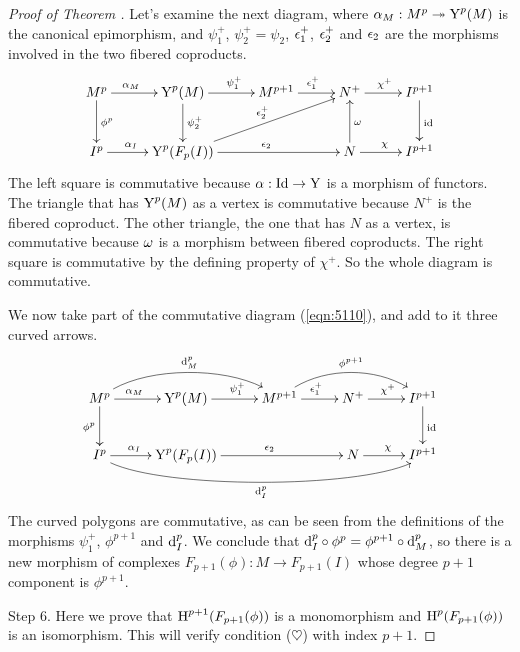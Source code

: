 \begin{proof}[Proof of Theorem \tup{\ref{thm:2880}}]
Let's examine the next diagram, where
$\alpha_M : M^p \twoheadrightarrow \operatorname{Y}^{p}(M)$ is the canonical epimorphism, and 
$\psi_1^+$, $\psi_2^+ = \psi_2$, $\epsilon_1^+$, $\epsilon_2^+$ and $\epsilon_2$ are the 
morphisms involved in  the two fibered coproducts. 
\begin{equation} \label{eqn:5110}
\UseTips \xymatrix @C=6ex @R=6ex {
M^p
\ar[r]^(0.4){\al_M}
\ar[d]^{\phi^p}
&
\opn{Y}^{p}(M)
\ar[r]^(0.55){\psi_1^+}
\ar[d]^{\psi_2^+}
&
M^{p + 1}
\ar[r]^{\ep_1^+}
&
N^+
\ar[r]^{\chi^+}
&
I^{p + 1}
\ar[d]^{\opn{id}}
\\
I^p
\ar[r]^(0.4){\al_I}
&
\opn{Y}^{p}(F_p(I))
\ar[rr]^{\ep_2}
\ar[urr]^{\ep_2^+}
&
&
N
\ar[r]^{\chi}
\ar[u]_{\om}
&
I^{p + 1}
} 
\end{equation}
The left square is commutative because $\alpha : \operatorname{Id} \to \operatorname{Y}$ is a 
morphism of functors. The triangle that has $\operatorname{Y}^{p}(M)$ as a vertex is 
commutative because $N^+$ is the fibered coproduct. The other triangle, the 
one that has $N$ as a vertex, is commutative because $\omega$ is a morphism 
between fibered coproducts. The right square is commutative by the defining 
property of $\chi^+$. So the whole diagram is commutative. 

We now take part of the commutative diagram (\ref{eqn:5110}), and add to it 
three curved arrows. 
\begin{equation} \label{eqn:5111}
\UseTips \xymatrix @C=6ex @R=5.5ex {
M^p
\ar[r]^(0.4){\al_M}
\ar[d]_{\phi^p}
\ar@(ur,ul)[rr]^{\d_{M}^{p}}
&
\opn{Y}^{p}(M)
\ar[r]^(0.55){\psi_1^+}
&
M^{p + 1}
\ar[r]^{\ep_1^+}
\ar@(ur,ul)[rr]^{\phi^{p + 1}}
&
N^+
\ar[r]^{\chi^+}
&
I^{p + 1}
\ar[d]^{\opn{id}}
\\
I^p
\ar[r]^(0.4){\al_I}
\ar@(dr,dl)[rrrr]_{\d_{I}^{p}}
&
\opn{Y}^{p}(F_p(I))
\ar[rr]^{\ep_2}
&
&
N
\ar[r]^{\chi}
&
I^{p + 1}
} 
\end{equation}
The curved polygons are commutative, as can be seen from the definitions of the 
morphisms $\psi_1^+$, $\phi^{p + 1}$ and $\mathrm{d}_{I}^{p}$. We conclude that 
$\mathrm{d}_I^{p} \circ \phi^p = \phi^{p + 1} \circ \mathrm{d}_M^{p}$,
so there is a new morphism of complexes 
$F_{p + 1}(\phi) : M \to F_{p + 1}(I)$
whose degree $p + 1$ component is $\phi^{p + 1}$. 

\medskip \noindent
Step 6. Here we prove that $\operatorname{H}^{p + 1}(F_{p + 1}(\phi))$ is a 
monomorphism and $\operatorname{H}^{p}(F_{p + 1}(\phi))$ is an isomorphism.
This will verify condition ($\heartsuit$) with index $p + 1$.


\end{proof}
